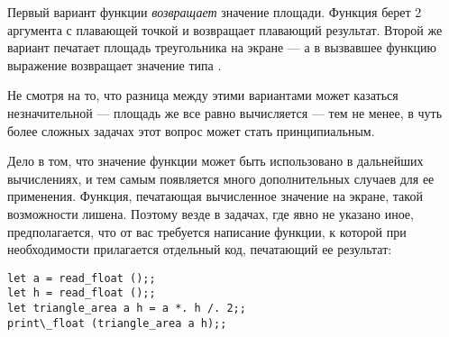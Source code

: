 Первый вариант функции \emph{возвращает} значение площади. 
Функция  берет 2 аргумента с плавающей точкой и 
возвращает плавающий результат.
Второй же вариант печатает площадь треугольника на экране --- а в вызвавшее
функцию выражение возвращает значение типа . 

Не смотря на то, что разница между этими вариантами может казаться 
незначительной --- площадь же все равно вычисляется --- тем не менее, 
в чуть более сложных задачах этот вопрос может стать принципиальным.

Дело в том, что значение функции может быть использовано в дальнейших 
вычислениях, и тем самым появляется много дополнительных случаев для 
ее применения. Функция, печатающая вычисленное значение на экране, такой 
возможности лишена. Поэтому везде в задачах, где явно не указано иное, 
предполагается, что от вас требуется написание функции, к которой при 
необходимости прилагается отдельный код, печатающий ее результат:

\begin{verbatim}
let a = read_float ();;
let h = read_float ();;
let triangle_area a h = a *. h /. 2;;
print\_float (triangle_area a h);;
\end{verbatim}
